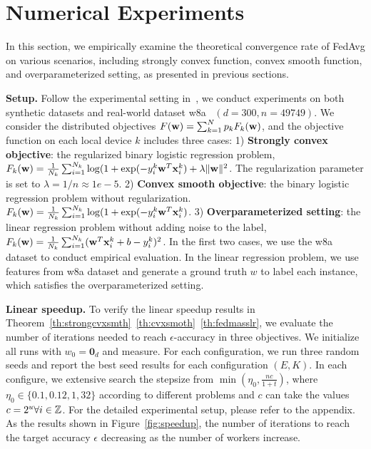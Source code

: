 


\section{Numerical Experiments}
\label{sec:exp}

In this section, we empirically examine the theoretical convergence rate of FedAvg on various scenarios, including strongly convex function, convex smooth function, and overparameterized setting, as presented in previous sections.

\textbf{Setup.} Follow the experimental setting in~\cite{stich2018local}, we
conduct experiments on both synthetic datasets and real-world dataset
w8a~\cite{platt1998fast} $(d=300, n=49749)$. We consider the distributed
objectives $F({\mathbf{w}}) = \sum_{k=1}^N p_kF_k({\mathbf{w}})$, and the objective function on
each local device $k$ includes three cases: 1) \textbf{Strongly convex
objective}: the regularized binary logistic regression problem, $F_k({\mathbf{w}}) =
\frac{1}{N_k} \sum_{i=1}^{N_k} \log( 1+ \exp(-y_i^k {\mathbf{w}}^T{\mathbf{x}}_i^k) + \lambda
\|{\mathbf{w}}\|^2$. The regularization parameter is set to $\lambda = 1/n \approx
1e-5$. 2) \textbf{Convex smooth objective}: the binary logistic regression
problem without regularization. $F_k({\mathbf{w}}) = \frac{1}{N_k} \sum_{i=1}^{N_k}
\log( 1+ \exp(-y_i^k {\mathbf{w}}^T{\mathbf{x}}_i^k)$. 3) \textbf{Overparameterized setting}:
the linear regression problem without adding noise to the label, $F_k({\mathbf{w}}) =
\frac{1}{N_k} \sum_{i=1}^{N_k} ({\mathbf{w}}^T{\mathbf{x}}_i^k + b  - y_i^k)^2$.  In the first
two cases, we use the w8a dataset to conduct empirical evaluation. 
In the linear regression problem, we use features from w8a dataset and 
generate a ground truth $w$ to label each instance, which satisfies the
overparameterized setting.

\textbf{Linear speedup.} To verify the linear speedup results in Theorem~\ref{th:strongcvxsmth}~\ref{th:cvxsmoth}~\ref{th:fedmasslr}, we evaluate the number of iterations needed to reach
$\epsilon$-accuracy in three objectives. We initialize all runs with $w_0 = \textbf{0}_d$ and measure. For each configuration, we run three random seeds and report
the best seed results for each configuration $(E, K)$. In each configure, we
extensive search the stepsize from $\min(\eta_0, \frac{nc}{1 + t})$, where
$\eta_0 \in \{0.1, 0.12, 1, 32 \}$ according to different problems and $c$ can
take the values $c = 2^u \forall i \in \mathbb{Z}$. For the detailed experimental setup,
please refer to the appendix. As the results shown in Figure~\ref{fig:speedup},
the number of iterations to reach the target accuracy $\epsilon$ decreasing 
as the number of workers increase. 

